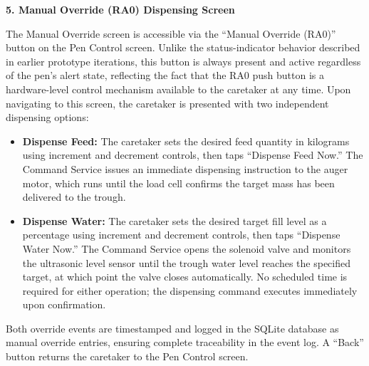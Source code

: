 \textbf{5. Manual Override (RA0) Dispensing Screen}

The Manual Override screen is accessible via the ``Manual Override (RA0)'' button on the Pen Control screen. Unlike the status-indicator behavior described in earlier prototype iterations, this button is always present and active regardless of the pen's alert state, reflecting the fact that the RA0 push button is a hardware-level control mechanism available to the caretaker at any time. Upon navigating to this screen, the caretaker is presented with two independent dispensing options:
\begin{itemize}
  \item \textbf{Dispense Feed:} The caretaker sets the desired feed quantity in kilograms using increment and decrement controls, then taps ``Dispense Feed Now.'' The Command Service issues an immediate dispensing instruction to the auger motor, which runs until the load cell confirms the target mass has been delivered to the trough.
  \item \textbf{Dispense Water:} The caretaker sets the desired target fill level as a percentage using increment and decrement controls, then taps ``Dispense Water Now.'' The Command Service opens the solenoid valve and monitors the ultrasonic level sensor until the trough water level reaches the specified target, at which point the valve closes automatically. No scheduled time is required for either operation; the dispensing command executes immediately upon confirmation.
\end{itemize}
Both override events are timestamped and logged in the SQLite database as manual override entries, ensuring complete traceability in the event log. A ``Back'' button returns the caretaker to the Pen Control screen.

